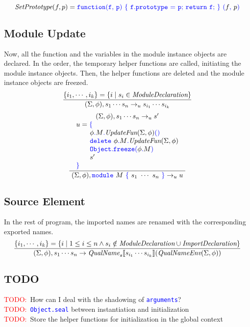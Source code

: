 \documentclass[a4paper]{article}
\newcommand{\ModuleDeclaration}{\emph{ModuleDeclaration}}
\newcommand{\ImportDeclaration}{\emph{ImportDeclaration}}
\newcommand{\code}[1]{\textcolor{blue}{\tt #1}}
\newcommand{\UpdateFun}{\emph{UpdateFun}}
\newcommand{\QualName}{\emph{QualName}}
\newcommand{\QualNameEnv}{\emph{QualNameEnv}}
\newcommand{\SetPrototype}{\emph{SetPrototype}}
\newcommand{\TODO}{\mbox{\textcolor{red}{TODO:}\ }}
\begin{document}
\begin{equation*}
\SetPrototype (f, p) = \code{function(f,}\ \code{ p)}\ \code{\{}\ \code{f.prototype}\ \code{=}\ \code{p}\code{;}\ \code{return}\ \code{f;}\ \code{\}}\ \code{(}f\code{,}\ p\code{)}
\end{equation*}

\subsection{Module Update}
Now, all the function and the variables in the module instance objects are declared.
In the order, the temporary helper functions are called, initiating the module instance objects.
Then, the helper functions are deleted and the module instance objects are freezed.
\begin{equation*}
\frac{\{ i_1, \cdots, i_k \} = \{ i \mid s_i \in \ModuleDeclaration \}}{(\Sigma, \phi), s_1 \cdots s_n \rightarrow_u s_{i_1} \cdots s_{i_k}}
\end{equation*}
\begin{equation*}
\frac{
\begin{array}{c}
(\Sigma, \phi), s_1 \cdots s_n \rightarrow_u s' \\
\begin{array}{l}
u = \code{\{} \\
\qquad \phi\code{.}M\code{.}\UpdateFun (\Sigma, \phi)\code{()} \\
\qquad \code{delete}\ \phi\code{.}M\code{.}\UpdateFun (\Sigma, \phi) \\
\qquad \code{Object.freeze(}\phi\code{.}M\code{)} \\
\qquad s' \\
\code{\}}
\end{array}
\end{array}
}{(\Sigma, \phi), \code{module}\ M\ \code{\{}\ s_1\ \cdots\ s_n\ \code{\}} \rightarrow_u u}
\end{equation*}

\subsection{Source Element}
In the rest of program, the imported names are renamed with the corresponding exported names.
\begin{equation*}
\frac{\{i_1, \cdots, i_k\} = \{i \mid 1 \le i \le n \wedge s_i \notin \ModuleDeclaration \cup \ImportDeclaration\}}{(\Sigma, \phi), s_1 \cdots s_n \rightarrow \QualName_s \llbracket s_{i_1} \cdots s_{i_k} \rrbracket (\QualNameEnv(\Sigma, \phi))}
\end{equation*}

\subsection{TODO}
\TODO How can I deal with the shadowing of \code{arguments}? \\
\TODO \code{Object.seal} between instantiation and initialization \\
\TODO Store the helper functions for initialization in the global context
\end{document}
